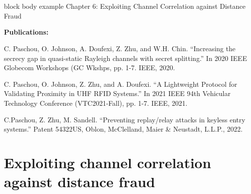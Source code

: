 \section*{}
\begin{frame}{}
\begin{beamercolorbox}[colsep=1.5pt,rounded=true,shadow=true]{block body example}
    \huge{Chapter 6: Exploiting Channel Correlation against Distance Fraud}
\end{beamercolorbox}
\textbf{Publications:}\\
\begin{small}
    C. Paschou, O. Johnson, A. Doufexi, Z. Zhu, and W.H. Chin. ``Increasing the secrecy gap in quasi-static Rayleigh channels with secret splitting.'' In 2020 IEEE Globecom Workshops (GC Wkshps, pp. 1-7. IEEE, 2020.

    C. Paschou, O. Johnson, Z. Zhu, and A. Doufexi. ``A Lightweight Protocol for Validating Proximity in UHF RFID Systems.'' In 2021 IEEE 94th Vehicular Technology Conference (VTC2021-Fall), pp. 1-7. IEEE, 2021.

    C.Paschou, Z. Zhu, M. Sandell.
    ``Preventing replay/relay attacks in keyless entry systems.'' Patent 54322US, Oblon, McClelland, Maier \& Neustadt, {L.L.P.}, 2022.
    
    \end{small}

\end{frame}


\section{Exploiting channel correlation against distance fraud}

